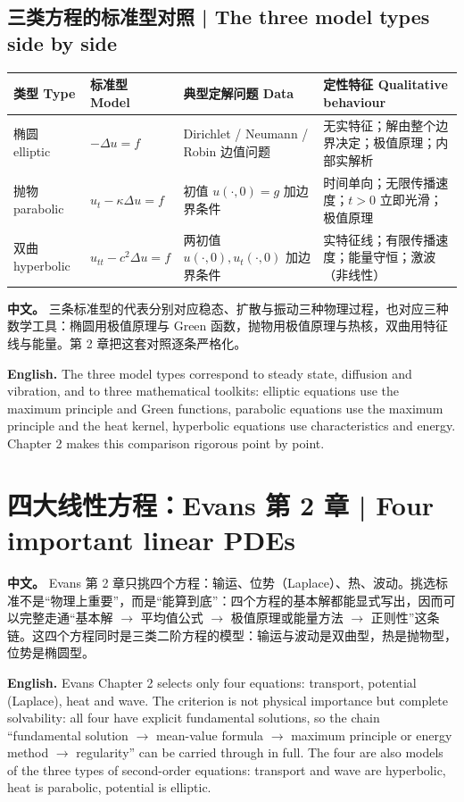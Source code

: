 \documentclass[UTF8,11pt,a4paper]{ctexart}
\newcommand{\APS}[2]{\par\noindent\textbf{中文。} #1\par\noindent\textbf{English.} #2\par\smallskip}
\begin{document}
\subsection{三类方程的标准型对照 | The three model types side by side}
\begin{center}\small
\begin{tabular}{@{}>{\raggedright\arraybackslash}p{1.5cm}>{\raggedright\arraybackslash}p{3.1cm}>{\raggedright\arraybackslash}p{4.2cm}>{\raggedright\arraybackslash}p{4.7cm}@{}}
\toprule
类型 Type & 标准型 Model & 典型定解问题 Data & 定性特征 Qualitative behaviour \\
\midrule
椭圆 elliptic & $-\Delta u=f$ & Dirichlet / Neumann / Robin 边值问题 & 无实特征；解由整个边界决定；极值原理；内部实解析 \\
抛物 parabolic & $u_t-\kappa\Delta u=f$ & 初值 $u(\cdot,0)=g$ 加边界条件 & 时间单向；无限传播速度；$t>0$ 立即光滑；极值原理 \\
双曲 hyperbolic & $u_{tt}-c^2\Delta u=f$ & 两初值 $u(\cdot,0),u_t(\cdot,0)$ 加边界条件 & 实特征线；有限传播速度；能量守恒；激波（非线性） \\
\bottomrule
\end{tabular}
\end{center}

\APS{三条标准型的代表分别对应稳态、扩散与振动三种物理过程，也对应三种数学工具：椭圆用极值原理与 Green 函数，抛物用极值原理与热核，双曲用特征线与能量。第 2 章把这套对照逐条严格化。}{The three model types correspond to steady state, diffusion and vibration, and to three mathematical toolkits: elliptic equations use the maximum principle and Green functions, parabolic equations use the maximum principle and the heat kernel, hyperbolic equations use characteristics and energy. Chapter 2 makes this comparison rigorous point by point.}

\section{四大线性方程：Evans 第 2 章 | Four important linear PDEs}
\APS{Evans 第 2 章只挑四个方程：输运、位势（Laplace）、热、波动。挑选标准不是``物理上重要''，而是``能算到底''：四个方程的基本解都能显式写出，因而可以完整走通``基本解 $\to$ 平均值公式 $\to$ 极值原理或能量方法 $\to$ 正则性''这条链。这四个方程同时是三类二阶方程的模型：输运与波动是双曲型，热是抛物型，位势是椭圆型。}{Evans Chapter 2 selects only four equations: transport, potential (Laplace), heat and wave. The criterion is not physical importance but complete solvability: all four have explicit fundamental solutions, so the chain ``fundamental solution $\to$ mean-value formula $\to$ maximum principle or energy method $\to$ regularity'' can be carried through in full. The four are also models of the three types of second-order equations: transport and wave are hyperbolic, heat is parabolic, potential is elliptic.}
\end{document}
